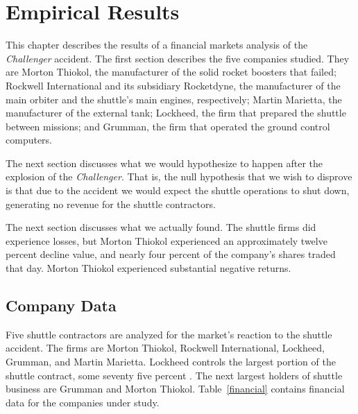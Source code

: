 
\chapter{Empirical Results}\label{empiric}

This chapter describes the results of a financial markets analysis of the {\em Challenger} accident. The first section describes the five companies studied. They are Morton Thiokol, the manufacturer of the solid rocket boosters that failed; Rockwell International and its subsidiary Rocketdyne, the manufacturer of the main orbiter and the shuttle's main engines, respectively; Martin Marietta, the manufacturer of the external tank; Lockheed, the firm that prepared the shuttle between missions; and Grumman, the firm that operated the ground control computers.

The next section discusses what we would hypothesize to happen after the explosion of the {\em Challenger}. That is, the null hypothesis that we wish to disprove is that due to the accident we would expect the shuttle operations to shut down, generating no revenue for the shuttle contractors.

The next section discusses what we actually found. The shuttle firms did experience losses, but Morton Thiokol experienced an approximately twelve percent decline value, and nearly four percent of the company's shares traded that day. Morton Thiokol experienced substantial negative returns.

\section{Company Data}

Five shuttle contractors are analyzed for the market's reaction to the shuttle accident. The firms are Morton Thiokol, Rockwell International, Lockheed, Grumman, and Martin Marietta. Lockheed controls the largest portion of the shuttle contract, some seventy five percent \cite{wsjfirms}. The next largest holders of shuttle business are Grumman and Morton Thiokol. Table~\ref{financial} contains financial data for the companies under study.

